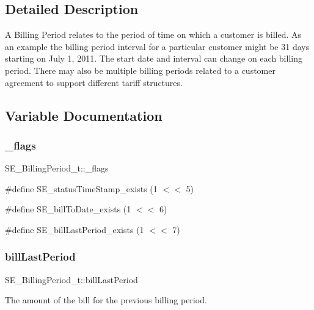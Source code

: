 \subsection{Detailed Description}
A Billing Period relates to the period of time on which a customer is billed. As an example the billing period interval for a particular customer might be 31 days starting on July 1, 2011. The start date and interval can change on each billing period. There may also be multiple billing periods related to a customer agreement to support different tariff structures. 

\subsection{Variable Documentation}
\mbox{\label{group__BillingPeriod_gae6a8b09a63ae09613246632c9d15b670}} 
\subsubsection{\texorpdfstring{\+\_\+flags}{\_flags}}
{\footnotesize\ttfamily S\+E\+\_\+\+Billing\+Period\+\_\+t\+::\+\_\+flags}

\#define S\+E\+\_\+status\+Time\+Stamp\+\_\+exists (1 $<$$<$ 5)

\#define S\+E\+\_\+bill\+To\+Date\+\_\+exists (1 $<$$<$ 6)

\#define S\+E\+\_\+bill\+Last\+Period\+\_\+exists (1 $<$$<$ 7) \mbox{\label{group__BillingPeriod_gad93346e423aed2fc21ff583d3496bc27}} 
\subsubsection{\texorpdfstring{bill\+Last\+Period}{billLastPeriod}}
{\footnotesize\ttfamily S\+E\+\_\+\+Billing\+Period\+\_\+t\+::bill\+Last\+Period}

The amount of the bill for the previous billing period. \mbox{\label{group__BillingPeriod_ga1f0db8a40f5377696dedbdb02875d386}} 
